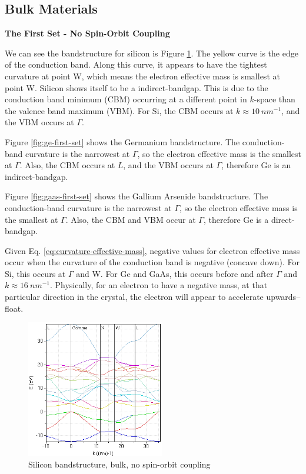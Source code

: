 \documentclass{IEEEtran}
\begin{document}
\subsection{Bulk Materials}

\textbf{The First Set - No Spin-Orbit Coupling}

We can see the bandstructure for silicon is Figure \ref{fig:si-first-set}. The yellow curve is the edge of the conduction band. Along this curve, it appears to have the tightest curvature at point W, which means the electron effective mass is smallest at point W. Silicon shows itself to be a indirect-bandgap. This is due to the conduction band minimum (CBM) occurring at a different point in \(k\)-space than the valence band maximum (VBM). For Si, the CBM occurs at \(k \approx 10 ~ nm^{-1}\), and the VBM occurs at \(\Gamma\).

Figure \ref{fig:ge-first-set} shows the Germanium bandstructure. The conduction-band curvature is the narrowest at \(\Gamma\), so the electron effective mass is the smallest at \(\Gamma\). Also, the CBM occurs at \(L\), and the VBM occurs at \(\Gamma\), therefore Ge is an indirect-bandgap.

Figure \ref{fig:gaas-first-set} shows the Gallium Arsenide bandstructure. The conduction-band curvature is the narrowest at \(\Gamma\), so the electron effective mass is the smallest at \(\Gamma\). Also, the CBM and VBM occur at \(\Gamma\), therefore Ge is a direct-bandgap. 

Given Eq. \ref{eq:curvature-effective-mass}, negative values for electron effective mass occur when the curvature of the conduction band is negative (concave down). For Si, this occurs at \(\Gamma\) and W. For Ge and GaAs, this occurs before and after \(\Gamma\) and \(k \approx 16 ~ nm^{-1}\). Physically, for an electron to have a negative mass, at that particular direction in the crystal, the electron will appear to accelerate upwards--float.

\begin{figure}[!ht] 
    \centering
    \includegraphics*[width = 6cm]{si-bands-firstset.png}
    \caption{Silicon bandstructure, bulk, no spin-orbit coupling}
    \label{fig:si-first-set}
\end{figure}    
\end{document}
